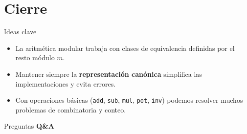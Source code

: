 \documentclass[aspectratio=169]{beamer}
\begin{document}
\section*{Cierre}

\begin{frame}{Ideas clave}
  \begin{itemize}
    \item La aritmética modular trabaja con clases de equivalencia definidas por el resto módulo \(m\).
    \item Mantener siempre la \textbf{representación canónica} simplifica las implementaciones y evita errores.
    \item Con operaciones básicas (\texttt{add}, \texttt{sub}, \texttt{mul}, \texttt{pot}, \texttt{inv}) podemos resolver muchos problemas de combinatoria y conteo.
  \end{itemize}
\end{frame}

\begin{frame}{Preguntas}
  \centering
  \Huge
  \textbf{Q\&A}
\end{frame}
\end{document}
